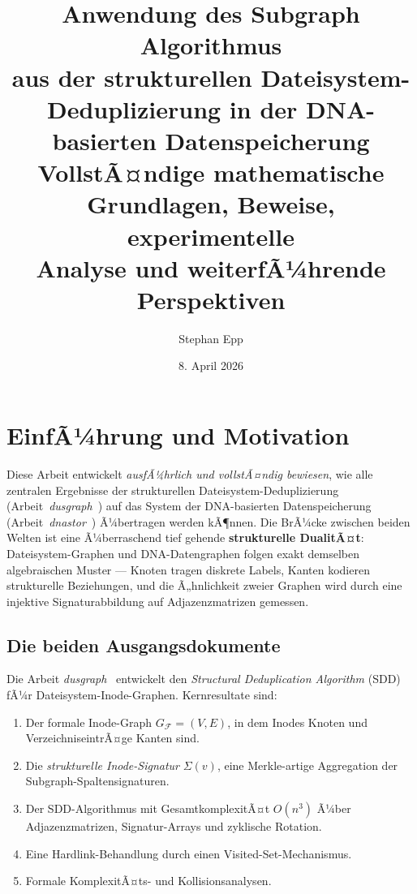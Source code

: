 ﻿\documentclass[a4paper,12pt]{article}
\title{%
  \textbf{Anwendung des Subgraph Algorithmus \\aus der strukturellen
  Dateisystem-Deduplizierung in der DNA-basierten Datenspeicherung}\\[0.6em]
  \large VollstÃ¤ndige mathematische Grundlagen, Beweise, experimentelle\\
  Analyse und weiterfÃ¼hrende Perspektiven}
\author{Stephan Epp}
\date{8. April 2026}
\theoremstyle{definition}
\theoremstyle{plain}
\begin{document}
\setlength{\emergencystretch}{3em}
\maketitle
\tableofcontents
\newpage

\section{EinfÃ¼hrung und Motivation}
\label{sec:einf}

Diese Arbeit entwickelt \emph{ausfÃ¼hrlich und vollstÃ¤ndig bewiesen}, wie alle
zentralen Ergebnisse der strukturellen Dateisystem-Deduplizierung
(Arbeit~\textit{dusgraph}~\cite{dusgraph}) auf das System der DNA-basierten
Datenspeicherung (Arbeit~\textit{dnastor}~\cite{dnastor}) Ã¼bertragen werden
kÃ¶nnen.  Die BrÃ¼cke zwischen beiden Welten ist eine Ã¼berraschend tief
gehende \textbf{strukturelle DualitÃ¤t}: Dateisystem-Graphen und
DNA-Datengraphen folgen exakt demselben algebraischen Muster ---
Knoten tragen diskrete Labels, Kanten kodieren strukturelle
Beziehungen, und die Ã„hnlichkeit zweier Graphen wird durch
eine injektive Signaturabbildung auf Adjazenzmatrizen gemessen.

\subsection{Die beiden Ausgangsdokumente}

Die Arbeit \textit{dusgraph}~\cite{dusgraph} entwickelt den
\emph{Structural Deduplication Algorithm} (SDD) fÃ¼r Dateisystem-Inode-Graphen.
Kernresultate sind:
\begin{enumerate}
  \item Der formale Inode-Graph $G_\mathcal{F} = (V,E)$, in dem Inodes
        Knoten und VerzeichniseintrÃ¤ge Kanten sind.
  \item Die \emph{strukturelle Inode-Signatur} $\Sigma(v)$, eine
        Merkle-artige Aggregation der Subgraph-Spaltensignaturen.
  \item Der SDD-Algorithmus mit GesamtkomplexitÃ¤t $O(n^3)$ Ã¼ber
        Ad\-ja\-zenz\-ma\-tri\-zen, Signatur-Arrays und zyklische Rotation.
  \item Eine Hardlink-Behandlung durch einen Visited-Set-Mechanismus.
  \item Formale KomplexitÃ¤ts- und Kollisionsanalysen.
\end{enumerate}
\end{document}
